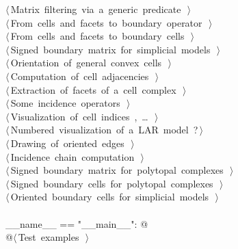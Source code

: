 \documentclass[11pt,oneside]{article}	%
\begin{document}
\begin{flushleft}
\begin{minipage}{\linewidth}
\begin{list}{}{}
\mbox{}\verb@@\hbox{$\langle\,$Matrix filtering via a generic predicate\nobreak\ {\footnotesize {}}$\,\rangle$}\verb@@\\
\mbox{}\verb@@\hbox{$\langle\,$From cells and facets to boundary operator\nobreak\ {\footnotesize {}}$\,\rangle$}\verb@@\\
\mbox{}\verb@@\hbox{$\langle\,$From cells and facets to boundary cells\nobreak\ {\footnotesize {}}$\,\rangle$}\verb@@\\
\mbox{}\verb@@\hbox{$\langle\,$Signed boundary matrix for simplicial models\nobreak\ {\footnotesize {}}$\,\rangle$}\verb@@\\
\mbox{}\verb@@\hbox{$\langle\,$Orientation of general convex cells\nobreak\ {\footnotesize {}}$\,\rangle$}\verb@@\\
\mbox{}\verb@@\hbox{$\langle\,$Computation of cell adjacencies\nobreak\ {\footnotesize {}}$\,\rangle$}\verb@@\\
\mbox{}\verb@@\hbox{$\langle\,$Extraction of facets of a cell complex\nobreak\ {\footnotesize {}}$\,\rangle$}\verb@@\\
\mbox{}\verb@@\hbox{$\langle\,$Some incidence operators\nobreak\ {\footnotesize {}}$\,\rangle$}\verb@@\\
\mbox{}\verb@@\hbox{$\langle\,$Visualization of cell indices\nobreak\ {\footnotesize {}, \ldots\ }$\,\rangle$}\verb@@\\
\mbox{}\verb@@\hbox{$\langle\,$Numbered visualization of a LAR model\nobreak\ {\footnotesize ?}$\,\rangle$}\verb@@\\
\mbox{}\verb@@\hbox{$\langle\,$Drawing of oriented edges\nobreak\ {\footnotesize {}}$\,\rangle$}\verb@@\\
\mbox{}\verb@@\hbox{$\langle\,$Incidence chain computation\nobreak\ {\footnotesize {}}$\,\rangle$}\verb@@\\
\mbox{}\verb@@\hbox{$\langle\,$Signed boundary matrix for polytopal complexes\nobreak\ {\footnotesize {}}$\,\rangle$}\verb@@\\
\mbox{}\verb@@\hbox{$\langle\,$Signed boundary cells for polytopal complexes\nobreak\ {\footnotesize {}}$\,\rangle$}\verb@@\\
\mbox{}\verb@@\hbox{$\langle\,$Oriented boundary cells for simplicial models\nobreak\ {\footnotesize {}}$\,\rangle$}\verb@@\\
\mbox{}\verb@@\\
\mbox{}\verb@if __name__ == "__main__": @\\
\mbox{}\verb@   @\hbox{$\langle\,$Test examples\nobreak\ {\footnotesize {}}$\,\rangle$}\verb@@\\
\mbox{}\verb@@{\NWsep}
\end{list}
\vspace{-2ex}
\end{minipage}\\[4ex]
\end{flushleft}
\end{document}
